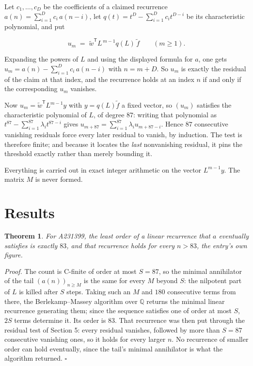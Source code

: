 \documentclass[11pt]{article}
\newtheorem{theorem}{Theorem}
\theoremstyle{definition}
\begin{document}
Let $c_1,\dots,c_D$ be the coefficients of a claimed recurrence $a(n) = \sum_{i=1}^{D} c_i\,a(n-i)$, let $q(t) = t^{D} - \sum_{i=1}^{D} c_i t^{D-i}$ be its characteristic polynomial, and put

\[u_m \;=\; \tilde w^{\mathsf T} L^{\,m-1} q(L)\,\tilde f \qquad (m \ge 1).\]

Expanding the powers of $L$ and using the displayed formula for $a$, one gets $u_m = a(n) - \sum_{i=1}^{D} c_i\,a(n-i)$ with $n = m + D$. So $u_m$ is exactly the residual of the claim at that index, and the recurrence holds at an index $n$ if and only if the corresponding $u_m$ vanishes.

Now $u_m = \tilde w^{\mathsf T} L^{m-1} y$ with $y = q(L)\tilde f$ a fixed vector, so $(u_m)$ satisfies the characteristic polynomial of $L$, of degree $87$: writing that polynomial as $t^{87} - \sum_{i=1}^{87} \lambda_i t^{87-i}$ gives $u_{m+87} = \sum_{i=1}^{87} \lambda_i u_{m+87-i}$. Hence $87$ consecutive vanishing residuals force every later residual to vanish, by induction. The test is therefore finite; and because it locates the {\itshape last} nonvanishing residual, it pins the threshold exactly rather than merely bounding it.

Everything is carried out in exact integer arithmetic on the vector $L^{m-1}y$. The matrix $M$ is never formed.

\section{Results}

\begin{theorem} For A231399, the least order of a linear recurrence that $a$ eventually satisfies is exactly $83$, and that recurrence holds for every $n > 83$, the entry's own figure.\end{theorem}

{\itshape Proof.} The count is C-finite of order at most $S = 87$, so the minimal annihilator of the tail $(a(n))_{n \ge M}$ is the same for every $M$ beyond $S$: the nilpotent part of $L$ is killed after $S$ steps. Taking such an $M$ and $180$ consecutive terms from there, the Berlekamp--Massey algorithm over $\mathbb{Q}$ returns the minimal linear recurrence generating them; since the sequence satisfies one of order at most $S$, $2S$ terms determine it. Its order is $83$. That recurrence was then put through the residual test of Section 5: every residual vanishes, followed by more than $S = 87$ consecutive vanishing ones, so it holds for every larger $n$. No recurrence of smaller order can hold eventually, since the tail's minimal annihilator is what the algorithm returned. $\square$
\end{document}

